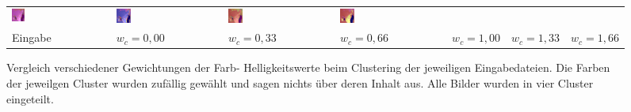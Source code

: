 \begin{figure}[h!]
\begin{tabular}{p{}p{}p{}p{}p{}p{}p{}}
		\includegraphics[width=0.14\textwidth]{images/gen/color_weight/p03_04.png_0.66.png} &
		\includegraphics[width=0.14\textwidth]{images/gen/color_weight/p03_04.png_1.00.png} &
		\includegraphics[width=0.14\textwidth]{images/gen/color_weight/p03_04.png_1.33.png} &
		\includegraphics[width=0.14\textwidth]{images/gen/color_weight/p03_04.png_1.66.png} \\
		
		\hspace{2pt}\newline\centering Eingabe & 
		\hspace{2pt}\newline\centering $w_c=0,00$ &
		\hspace{2pt}\newline\centering $w_c=0,33$ &
		\hspace{2pt}\newline\centering $w_c=0,66$ &
		\hspace{2pt}\newline\centering $w_c=1,00$ &
		\hspace{2pt}\newline\centering $w_c=1,33$ &
		\hspace{2pt}\newline\centering $w_c=1,66$
	\end{tabular}
	\caption{Vergleich verschiedener Gewichtungen der Farb- \bzw Helligkeitswerte beim Clustering der jeweiligen Eingabedateien. Die Farben der jeweilgen Cluster wurden zufällig gewählt und sagen nichts über deren Inhalt aus. Alle Bilder wurden in vier Cluster eingeteilt.}
	\label{fig:filterbank_weights_col}
\end{figure}

